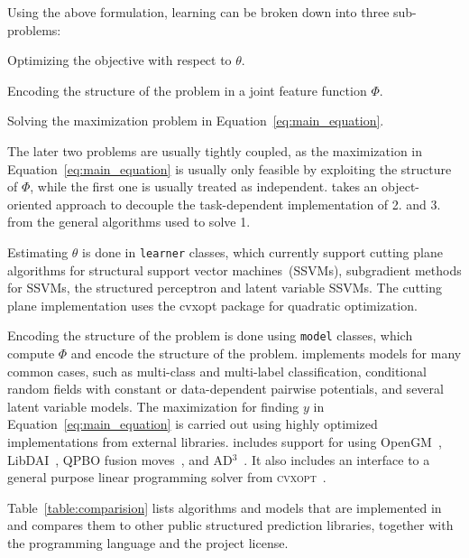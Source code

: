Using the above formulation, learning can be broken down into three sub-problems:
\begin{enumerate*}
    \item Optimizing the objective with respect to $\theta$.
    \item Encoding the structure of the problem in a joint feature function $\Phi$.
    \item Solving the maximization problem in Equation~\ref{eq:main_equation}.
\end{enumerate*}
The later two problems are usually tightly coupled, as the maximization in
Equation~\ref{eq:main_equation} is usually only feasible by exploiting the
structure of $\Phi$, while the first one is usually treated as independent.
\pystruct takes an object-oriented approach to decouple the task-dependent
implementation of 2. and 3. from the general algorithms used to solve 1.

Estimating $\theta$ is done in \texttt{learner} classes, which currently
support cutting plane algorithms for structural support vector
machines~(SSVMs), subgradient methods for SSVMs, the structured perceptron and
latent variable SSVMs. The cutting plane implementation uses the {\sc cvxopt}
package \citep{dahl2006cvxopt} for quadratic optimization.

Encoding the structure of the problem is done using \texttt{model} classes, which
compute $\Phi$ and encode the structure of the problem.
\pystruct implements models for many common cases, such as multi-class and
multi-label classification, conditional random fields with constant or
data-dependent pairwise potentials, and several latent variable models.
The maximization for finding $y$ in Equation~\ref{eq:main_equation} is carried out
using highly optimized implementations from external libraries. \pystruct
includes support for using {\sc OpenGM}~\citep{kappes2013comparative}, {\sc
LibDAI}~\citep{Mooij_libDAI_10}, QPBO fusion moves~\citep{rother2007optimizing},
and {\sc AD$^3$}~\citep{martins2011augmented}. It also includes an interface to
a general purpose linear programming solver from \textsc{cvxopt}~\cite{dahl2006cvxopt}.

Table~\ref{table:comparision} lists algorithms and models that are implemented in \pystruct and
compares them to other public structured prediction libraries, together with
the programming language and the project license.


